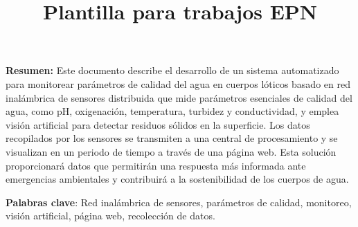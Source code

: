 \documentclass[12pt,a4paper]{book}
\title{Plantilla para trabajos EPN}
\renewcommand{\cleardoublepage}{\clearpage}
\begin{document}
\maketitlepage %
\newpage
\textbf{Resumen:}
Este documento describe el desarrollo de un sistema automatizado para monitorear parámetros de calidad del agua en cuerpos lóticos basado en red inalámbrica de sensores distribuida que mide parámetros esenciales de calidad del agua, como pH, oxigenación, temperatura, turbidez y conductividad, y emplea visión artificial para detectar residuos sólidos en la superficie. Los datos recopilados por los sensores se transmiten a una central de procesamiento y se visualizan en un periodo de tiempo a través de una página web. Esta solución proporcionará datos que permitirán una respuesta más informada ante emergencias ambientales y contribuirá a la sostenibilidad de los cuerpos de agua.

\textbf{Palabras clave}: Red inalámbrica de sensores, parámetros de calidad, monitoreo, visión artificial, página web, recolección de datos.
\newpage



\tableofcontents %
\listoffigures   %
\listoftables    %










%


%
%

\cleardoublepage
{}
{}
\printbibliography[title={Referencias}] %
\end{document}
